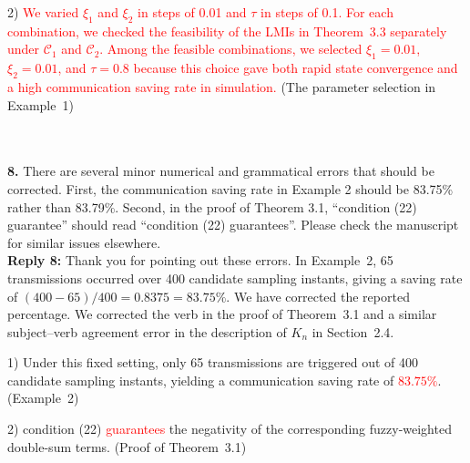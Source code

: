 \documentclass[10pt,fleqn]{article}
\begin{document}
2) \textcolor{red}{We varied $\xi_1$ and $\xi_2$ in steps of 0.01 and $\tau$ in steps of 0.1. For each combination, we checked the feasibility of the LMIs in Theorem~3.3 separately under $\mathcal C_1$ and $\mathcal C_2$. Among the feasible combinations, we selected $\xi_1=0.01$, $\xi_2=0.01$, and $\tau=0.8$ because this choice gave both rapid state convergence and a high communication saving rate in simulation.} (The parameter selection in Example~1)\par
\endgroup
%
%


~\\
\\
\textbf{8.} There are several minor numerical and grammatical errors that should be corrected. First, the communication saving rate in Example 2 should be 83.75\% rather than 83.79\%. Second, in the proof of Theorem 3.1, ``condition (22) guarantee'' should read ``condition (22) guarantees''. Please check the manuscript for similar issues elsewhere.
\\[10pt]
\begingroup
\setlength{\parskip}{6pt}
\indent \textbf{Reply 8:} Thank you for pointing out these errors. In Example~2, 65 transmissions occurred over 400 candidate sampling instants, giving a saving rate of $(400-65)/400=0.8375=83.75\%$. We have corrected the reported percentage. We corrected the verb in the proof of Theorem~3.1 and a similar subject--verb agreement error in the description of $K_n$ in Section~2.4.\par
1) Under this fixed setting, only 65 transmissions are triggered out of 400 candidate sampling instants, yielding a communication saving rate of \textcolor{red}{$83.75\%$}. (Example~2)\par
2) condition (22) \textcolor{red}{guarantees} the negativity of the corresponding fuzzy-weighted double-sum terms. (Proof of Theorem~3.1)\par
\endgroup\vspace{6pt}
\end{document}
